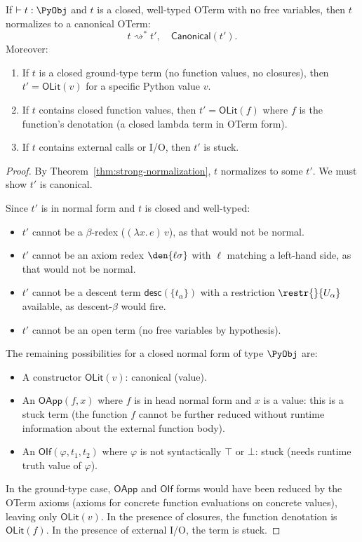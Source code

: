 \begin{theorem}
\label{thm:oterm-canonicity}
If $\vdash t : \PyObj$ and $t$ is a closed, well-typed OTerm with no
free variables, then $t$ normalizes to a canonical OTerm:
\[
  t \rightsquigarrow^* t',\quad \mathsf{Canonical}(t').
\]
Moreover:
\begin{enumerate}
\item If $t$ is a closed ground-type term (no function values, no closures),
  then $t' = \mathsf{OLit}(v)$ for a specific Python value $v$.
\item If $t$ contains closed function values, then $t' = \mathsf{OLit}(f)$
  where $f$ is the function's denotation (a closed lambda term in OTerm form).
\item If $t$ contains external calls or I/O, then $t'$ is stuck.
\end{enumerate}
\end{theorem}

\begin{proof}
By Theorem~\ref{thm:strong-normalization}, $t$ normalizes to some $t'$.
We must show $t'$ is canonical.

Since $t'$ is in normal form and $t$ is closed and well-typed:
\begin{itemize}
\item $t'$ cannot be a $\beta$-redex ($(\lambda x.\,e)\,v$), as that would
  not be normal.
\item $t'$ cannot be an axiom redex $\den{\ell\sigma}$ with $\ell$
  matching a left-hand side, as that would not be normal.
\item $t'$ cannot be a descent term $\mathsf{desc}(\{t_\alpha\})$
  with a restriction $\restr{}{U_\alpha}$ available, as descent-$\beta$
  would fire.
\item $t'$ cannot be an open term (no free variables by hypothesis).
\end{itemize}

The remaining possibilities for a closed normal form of type $\PyObj$ are:
\begin{itemize}
\item A constructor $\mathsf{OLit}(v)$: canonical (value).
\item An $\mathsf{OApp}(f, x)$ where $f$ is in head normal form and
  $x$ is a value: this is a stuck term (the function $f$ cannot be
  further reduced without runtime information about the external function body).
\item An $\mathsf{OIf}(\varphi, t_1, t_2)$ where $\varphi$ is not
  syntactically $\top$ or $\bot$: stuck (needs runtime truth value of $\varphi$).
\end{itemize}

In the ground-type case, $\mathsf{OApp}$ and $\mathsf{OIf}$ forms
would have been reduced by the OTerm axioms (axioms for concrete function
evaluations on concrete values), leaving only $\mathsf{OLit}(v)$.
In the presence of closures, the function denotation is $\mathsf{OLit}(f)$.
In the presence of external I/O, the term is stuck.
\end{proof}

